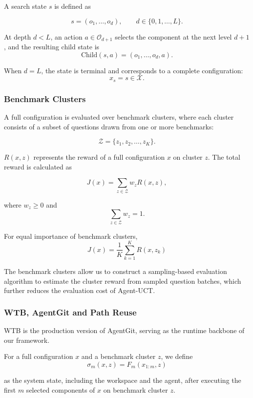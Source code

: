 \documentclass{article}
\begin{document}
A search state \(s\) is defined as 

\[
s = (o_1, \dots, o_d), \qquad d \in \{0,1,\dots,L\} .
\]


At depth \(d<L\), an action \(a \in \mathcal O_{d+1}\) selects the component at the next level  \(d+1\), and the resulting child state is
\[
\mathrm{Child}(s,a) = (o_1,\dots,o_d,a).
\]


When \(d=L\), the state is terminal and corresponds to a complete configuration:
\[
x_s=s\in\mathcal X.
\]

\subsubsection{Benchmark Clusters }




A full configuration is evaluated over benchmark clusters, where each cluster consists of a subset of questions drawn from one or more benchmarks:

\[
\mathcal Z = \{z_1, z_2, \dots, z_K\}.
\]

\(R(x,z)\) represents the reward of a full configuration \(x\) on cluster \(z\). The total reward is calculated as 

\[
J(x) = \sum_{z \in \mathcal Z} w_z R(x,z) ,
\]

where \(w_z \ge 0\) and
\[
\sum_{z\in\mathcal Z}w_z=1.
\]

For equal importance of benchmark clusters, 
\[
J(x) = \frac{1}{K} \sum_{k=1}^{K} R(x, z_k)
\]

The benchmark clusters allow us to construct a sampling-based evaluation algorithm to estimate the cluster reward from sampled question batches, which further reduces the evaluation cost of Agent-UCT.


\subsubsection{WTB, AgentGit and Path Reuse}

WTB is the production version of AgentGit, serving as the runtime backbone of our framework.

For a full configuration \(x\) and a benchmark cluster \(z\), we define
\[
\sigma_m(x,z) = F_m(x_{1:m}, z)
\]


as the system state, including the workspace and the agent, after executing the first \(m\) selected components of \(x\) on benchmark cluster \(z\). 
\end{document}
